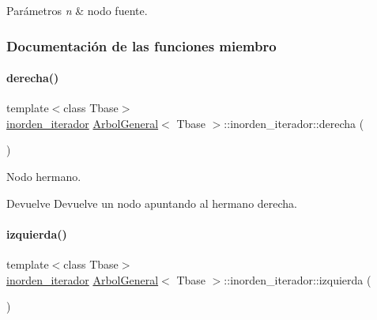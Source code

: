 \begin{DoxyParams}{Parámetros}
{\em n} & nodo fuente. \\
\hline
\end{DoxyParams}


\subsubsection{Documentación de las funciones miembro}
\hypertarget{classArbolGeneral_1_1inorden__iterador_a374dc7ff5ed5e568ca496f103cf73a5d}{}\label{classArbolGeneral_1_1inorden__iterador_a374dc7ff5ed5e568ca496f103cf73a5d} 
\paragraph{\texorpdfstring{derecha()}{derecha()}}
{\footnotesize\ttfamily template$<$class Tbase$>$ \\
\hyperlink{classArbolGeneral_1_1inorden__iterador}{inorden\+\_\+iterador} \hyperlink{classArbolGeneral}{Arbol\+General}$<$ Tbase $>$\+::inorden\+\_\+iterador\+::derecha (\begin{DoxyParamCaption}{ }\end{DoxyParamCaption})\hspace{0.3cm}{\ttfamily [inline]}}



Nodo hermano. 

\begin{DoxyReturn}{Devuelve}
Devuelve un nodo apuntando al hermano derecha. 
\end{DoxyReturn}
\hypertarget{classArbolGeneral_1_1inorden__iterador_acfcff093a9e0d3869ec180f053393e0c}{}\label{classArbolGeneral_1_1inorden__iterador_acfcff093a9e0d3869ec180f053393e0c} 
\paragraph{\texorpdfstring{izquierda()}{izquierda()}}
{\footnotesize\ttfamily template$<$class Tbase$>$ \\
\hyperlink{classArbolGeneral_1_1inorden__iterador}{inorden\+\_\+iterador} \hyperlink{classArbolGeneral}{Arbol\+General}$<$ Tbase $>$\+::inorden\+\_\+iterador\+::izquierda (\begin{DoxyParamCaption}{ }\end{DoxyParamCaption})\hspace{0.3cm}{\ttfamily [inline]}}



